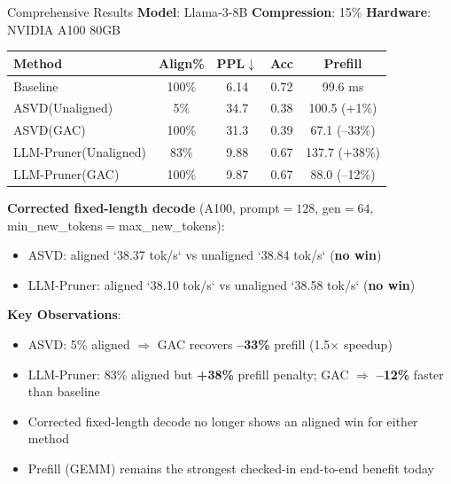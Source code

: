 \documentclass[aspectratio=169,10pt]{beamer}
\begin{document}
\begin{frame}{Comprehensive Results}
\vspace{-0.2cm}
\small
\textbf{Model}: Llama-3-8B \quad\textbf{Compression}: 15\% \quad\textbf{Hardware}: NVIDIA A100 80GB

\vspace{0.3cm}
\begin{table}
\centering
\small
\begin{tabular}{@{}lcccc@{}}
\toprule
\textbf{Method} & \textbf{Align\%} & \textbf{PPL}$\downarrow$ & \textbf{Acc} & \textbf{Prefill} \\
\midrule
\rowcolor{gray!10} Baseline & 100\% & 6.14 & 0.72 & 99.6 ms \\
\midrule
ASVD(Unaligned) & 5\% & 34.7 & 0.38 & 100.5 \textcolor{cred}{(+1\%)} \\
ASVD(GAC) & 100\% & 31.3 & 0.39 & 67.1 \textcolor{cgreen}{(--33\%)} \\
\midrule
LLM-Pruner(Unaligned) & 83\% & 9.88 & 0.67 & 137.7 \textcolor{cred}{(+38\%)} \\
LLM-Pruner(GAC) & 100\% & 9.87 & 0.67 & 88.0 \textcolor{cgreen}{(--12\%)} \\
\bottomrule
\end{tabular}
\end{table}

\vspace{0.15cm}
\textbf{Corrected fixed-length decode} (A100, prompt${=}128$, gen${=}64$, min\_new\_tokens${=}$max\_new\_tokens):
\begin{itemize}\setlength\itemsep{0.1em}
\item ASVD: aligned `38.37 tok/s` vs unaligned `38.84 tok/s` (\textbf{no win})
\item LLM-Pruner: aligned `38.10 tok/s` vs unaligned `38.58 tok/s` (\textbf{no win})
\end{itemize}

\vspace{0.3cm}
\textbf{Key Observations}:
\begin{itemize}\setlength\itemsep{0.1em}
\item ASVD: 5\% aligned $\Rightarrow$ GAC recovers \textbf{--33\%} prefill (1.5$\times$ speedup)
\item LLM-Pruner: 83\% aligned but \textbf{+38\%} prefill penalty; GAC $\Rightarrow$ \textbf{--12\%} faster than baseline
\item Corrected fixed-length decode no longer shows an aligned win for either method
\item Prefill (GEMM) remains the strongest checked-in end-to-end benefit today
\end{itemize}
\end{frame}
\end{document}
